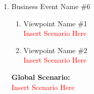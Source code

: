 \documentclass[]{article}
\begin{document}
\begin{enumerate}[label={\bf BE\arabic*.}]
		\begin{enumerate}[label=\textbf{VP\arabic*.}]
			\item Viewpoint Name \#1 \\
				\textcolor{red}{Insert Scenario Here}
			\item Viewpoint Name \#2 \\
				\textcolor{red}{Insert Scenario Here}
		\end{enumerate}
		{\bf Global Scenario:}\\
		\textcolor{red}{Insert Scenario Here}
	\item Business Event Name \#6
	\begin{enumerate}[label={\bf VP\arabic*.}]
		\item Viewpoint Name \#1 \\
		\textcolor{red}{Insert Scenario Here}
		\item Viewpoint Name \#2 \\
		\textcolor{red}{Insert Scenario Here}
	\end{enumerate}
	{\bf Global Scenario:}\\
	\textcolor{red}{Insert Scenario Here}
\end{enumerate}
\end{document}
